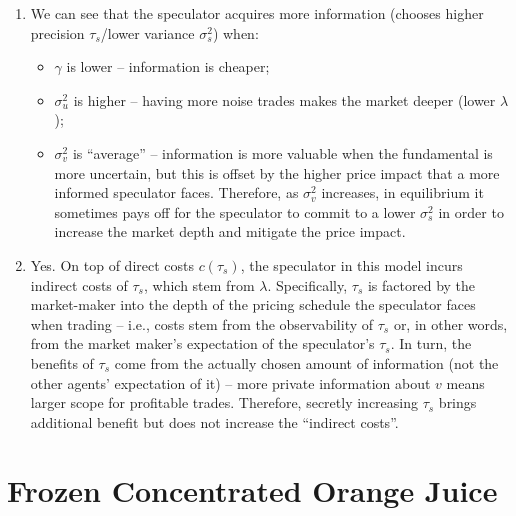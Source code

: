 \documentclass[a4paper]{article}
\begin{document}
\begin{enumerate}
	\item We can see that the speculator acquires more information (chooses higher precision $\tau_s$/lower variance $\sigma^2_s$) when:
	\begin{itemize}
		\item $\gamma$ is lower -- information is cheaper;
		\item $\sigma^2_u$ is higher -- having more noise trades makes the market deeper (lower $\lambda$);
		\item $\sigma^2_v$ is ``average'' -- information is more valuable when the fundamental is more uncertain, but this is offset by the higher price impact that a more informed speculator faces. Therefore, as $\sigma^2_v$ increases, in equilibrium it sometimes pays off for the speculator to commit to a lower $\sigma^2_s$ in order to increase the market depth and mitigate the price impact.
	\end{itemize}
	
	\item Yes. On top of direct costs $c(\tau_s)$, the speculator in this model incurs indirect costs of $\tau_s$, which stem from $\lambda$. Specifically, $\tau_s$ is factored by the market-maker into the depth of the pricing schedule the speculator faces when trading -- i.e., costs stem from the observability of $\tau_s$ or, in other words, from the market maker's expectation of the speculator's $\tau_s$. In turn, the benefits of $\tau_s$ come from the actually chosen amount of information (not the other agents' expectation of it) -- more private information about $v$ means larger scope for profitable trades. Therefore, secretly increasing $\tau_s$ brings additional benefit but does not increase the ``indirect costs''.
\end{enumerate}
\fi





\section{Frozen Concentrated Orange Juice}
\end{document}

